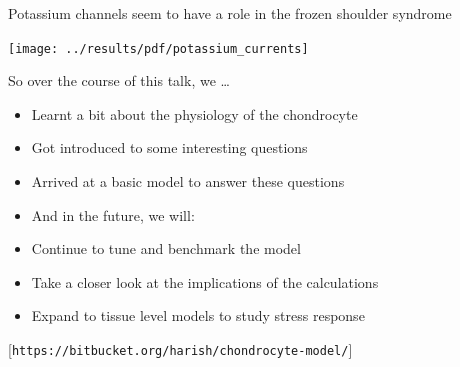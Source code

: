 \documentclass{beamer}
\newcommand{\references}[1] {
  \begin{flushright}
    \scriptsize [#1] \normalsize
  \end{flushright}
}
\begin{document}
\begin{frame}{Potassium channels seem to have a role in the frozen
    shoulder syndrome}

  \vspace{-0.4cm}

  \begin{center}
    \texttt{[image: ../results/pdf/potassium\_currents]}
  \end{center}

  \vspace{1.8em}

\end{frame}


\begin{frame}{So over the course of this talk, we \ldots}

  \begin{itemize}
  \item Learnt a bit about the physiology of the chondrocyte
  \item Got introduced to some interesting questions
  \item Arrived at a basic model to answer these questions\\[0.5cm]
  \end{itemize}

  \pause

  \begin{itemize}
    \item<2->[] \hspace{-0.5cm} And in the future, we will:
  \item<2-> Continue to tune and benchmark the model
  \item<2-> Take a closer look at the implications of the calculations
  \item<2-> Expand to tissue level models to study stress response
  \end{itemize}

  \references{{\tt https://bitbucket.org/harish/chondrocyte-model/}}

\end{frame}
\end{document}
